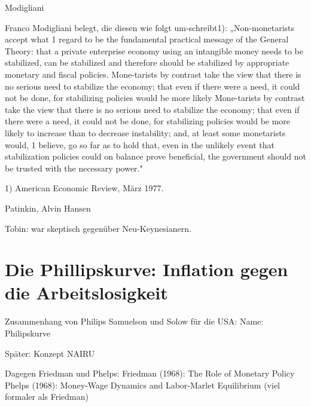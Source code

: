 Modigliani

Franco Modigliani belegt, die diesen wie folgt um-schreibt1): „Non-monetarists accept what 1 regard to be the fundamental practical message of the General Theory: that a private enterprise economy using an intangible money needs to be stabilized, can be stabilized and therefore should be stabilized by appropriate monetary and fiscal policies. Mone-tarists by contrast take the view that there is no serious need to stabilize the economy; that even if there were a need, it could not be done, for stabilizing policies would be more likely
Mone-tarists by contrast take the view that there is no serious need to stabilize the economy; that even if there were a need, it could not be done, for stabilizing policies would be more likely to increase than to decrease instability; and, at least some monetarists would, 1 believe, go so far as to hold that, even in the unlikely event that stabilization policies could on balance prove beneficial, the government should not be trusted with the necessary power."

1) American Economic Review, März 1977.

Patinkin, Alvin Hansen

Tobin: war skeptisch gegenüber Neu-Keynesianern. \textcite[S. 398]{Snowdon2005}

\section{Die Phillipskurve: Inflation gegen die Arbeitslosigkeit} \label{sec: Phillips}

Zusammenhang von Philips
Samuelson und Solow für die USA: Name: Philipskurve


Später: Konzept NAIRU


Dagegen Friedman und Phelps:
Friedman (1968): The Role of Monetary Policy
Phelps (1968): Money-Wage Dynamics and Labor-Marlet Equilibrium (viel formaler als Friedman)



